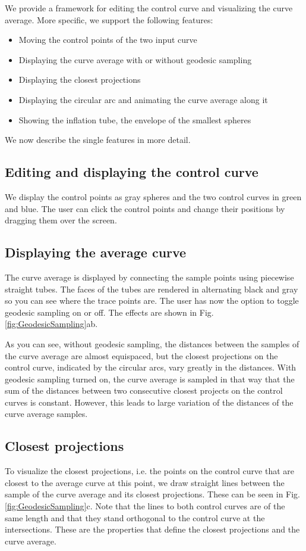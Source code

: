 \documentclass[journal, letterpaper]{IEEEtran}
\newcommand{\cre}{\color{red}}
\newcommand{\cbl}{\color{black}}
\begin{document}
We provide a framework for editing the control curve and visualizing the curve average.
More specific, we support the following features: 
\begin{itemize}
	\item Moving the control points of the two input curve
	\item Displaying the curve average with or without geodesic sampling
	\item Displaying the closest projections
	\item Displaying the circular arc and animating the curve average along it
	\item Showing the inflation tube, the envelope of the smallest spheres
\end{itemize}
We now describe the \cre single \cbl features in more detail.

\subsection{Editing and displaying the control curve}
We display the control points as gray spheres and the two control curves in green and blue.
The user can click the control points and change their positions by dragging them over the screen.

\subsection{Displaying the average curve}
The curve average is displayed by connecting the sample points using piecewise straight tubes. The faces of the tubes are rendered in alternating black and gray so you can see where the trace points are.
The user has now the option to toggle geodesic sampling on or off. The effects are shown in Fig.\ref{fig:GeodesicSampling}ab. 

\cre As you can see, \cbl without geodesic sampling, the distances between the samples of the curve average are almost equispaced, but the closest projections on the control curve, indicated by the circular arcs, vary greatly in the distances. With geodesic sampling turned on, the curve average is sampled in that way that the sum of the distances between two consecutive closest projects on the control curves is constant. However, this leads to large variation of the distances of the curve average samples.

\subsection{Closest projections}
To visualize the closest projections, i.e. the points on the control curve that are closest to the average curve at this point, we draw straight lines between the sample of the curve average and its closest projections. These can be seen in Fig.\ref{fig:GeodesicSampling}c. Note that the lines to both control curves are of the same length and that they stand orthogonal to the control curve at the intersections. These are the properties that define the closest projections and the curve average.
\end{document}
